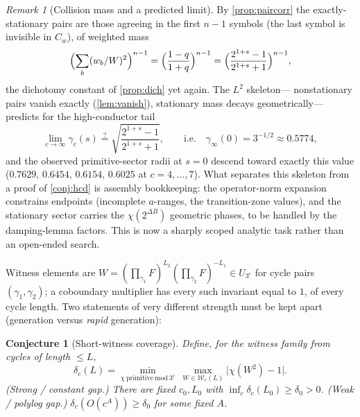 \documentclass[11pt]{article}
\theoremstyle{plain}
\newtheorem{conjecture}{Conjecture}
\theoremstyle{definition}
\theoremstyle{remark}
\newtheorem*{remark}{Remark}
\begin{document}
\begin{remark}[Collision mass and a predicted limit]\label{rem:collision}
By \cref{prop:paircorr} the exactly-stationary pairs are those agreeing in the
first $n-1$ symbols (the last symbol is invisible in $C_w$), of weighted mass
\[
\Bigl(\sum_b(w_b/W)^2\Bigr)^{n-1}
=\Bigl(\frac{1-q}{1+q}\Bigr)^{n-1}
=\Bigl(\frac{2^{1+s}-1}{2^{1+s}+1}\Bigr)^{n-1},
\]
the dichotomy constant of \cref{prop:dich} yet again. The $L^2$ skeleton---%
nonstationary pairs vanish exactly (\cref{lem:vanish}), stationary mass decays
geometrically---predicts for the high-conductor tail
\[
\lim_{c\to\infty}\gamma_c(s)\stackrel{?}{=}
\sqrt{\frac{2^{1+s}-1}{2^{1+s}+1}},
\qquad\text{i.e.}\quad
\gamma_\infty(0)=3^{-1/2}\approx0.5774 ,
\]
and the observed primitive-sector radii at $s=0$ descend toward exactly this
value ($0.7629,\,0.6454,\,0.6154,\,0.6025$ at $c=4,\dots,7$). What separates
this skeleton from a proof of \cref{conj:hcd} is assembly bookkeeping: the
operator-norm expansion constrains endpoints (incomplete $a$-ranges, the
transition-zone values), and the stationary sector carries the
$\chi(2^{\Delta B})$ geometric phases, to be handled by the damping-lemma
factors. This is now a sharply scoped analytic task rather than an open-ended
search.
\end{remark}

Witness elements are
$W=(\prod_{\gamma_1}F)^{L_2}(\prod_{\gamma_2}F)^{-L_1}\in U_{3^c}$ for cycle
pairs $(\gamma_1,\gamma_2)$; a coboundary multiplier has every such invariant
equal to $1$, of every cycle length. Two statements of very different strength
must be kept apart (generation versus \emph{rapid} generation):

\begin{conjecture}[Short-witness coverage]\label{conj:mult}
Define, for the witness family from cycles of length $\le L$,
\[
\delta_c(L)=\min_{\chi\ \mathrm{primitive\ mod\ }3^c}\ \max_{W\in\mathcal W_c(L)}
\bigl|\chi(W^2)-1\bigr| .
\]
\emph{(Strong / constant gap.)} There are fixed $c_0,L_0$ with
$\inf_c\delta_c(L_0)\ge\delta_0>0$.
\emph{(Weak / polylog gap.)} $\delta_c(O(c^A))\ge\delta_0$ for some fixed $A$.
\end{conjecture}
\end{document}
